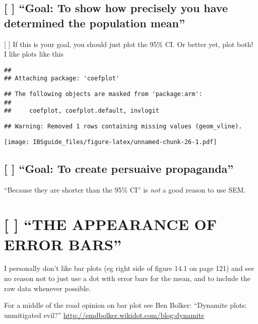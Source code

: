 \documentclass[]{book}
\theoremstyle{definition}
\theoremstyle{definition}
\theoremstyle{definition}
\theoremstyle{remark}
\begin{document}
\subsection{\texorpdfstring{{[} {]} ``Goal: To show how precisely you
have determined the population
mean''}{{[} {]} Goal: To show how precisely you have determined the population mean}}\label{goal-to-show-how-precisely-you-have-determined-the-population-mean}

{[} {]} If this is your goal, you should just plot the 95\% CI. Or
better yet, plot both! I like plots like this

\begin{verbatim}
## 
## Attaching package: 'coefplot'
\end{verbatim}

\begin{verbatim}
## The following objects are masked from 'package:arm':
## 
##     coefplot, coefplot.default, invlogit
\end{verbatim}

\begin{verbatim}
## Warning: Removed 1 rows containing missing values (geom_vline).
\end{verbatim}

\texttt{[image: IBSguide\_files/figure-latex/unnamed-chunk-26-1.pdf]}

\subsection{\texorpdfstring{{[} {]} ``Goal: To create persuaive
propaganda''}{{[} {]} Goal: To create persuaive propaganda}}\label{goal-to-create-persuaive-propaganda}

``Because they are shorter than the 95\% CI'' is \emph{not} a good
reason to use SEM.

\section{\texorpdfstring{{[} {]} ``THE APPEARANCE OF ERROR
BARS''}{{[} {]} THE APPEARANCE OF ERROR BARS}}\label{the-appearance-of-error-bars}

I personally don't like bar plots (eg right side of figure 14.1 on page
121) and see no reason not to just use a dot with error bars for the
mean, and to include the raw data whenever possible.

For a middle of the road opinion on bar plot see Ben Bolker: ``Dynamite
plots: unmitigated evil?''
\url{http://emdbolker.wikidot.com/blog:dynamite}
\end{document}
